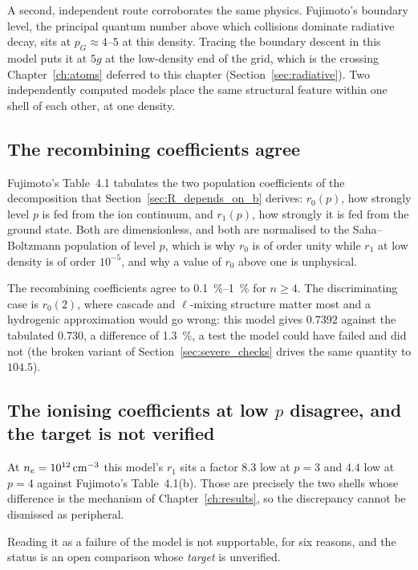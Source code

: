 A second, independent route corroborates the same physics. Fujimoto's boundary
level, the principal quantum number above which collisions dominate radiative
decay, sits at $p_G \approx 4$--$5$ at this density. Tracing the boundary
descent in this model puts it at $5g$ at the low-density end of the grid, which
is the crossing Chapter~\ref{ch:atoms} deferred to this chapter
(Section~\ref{sec:radiative}). Two independently computed models place the same
structural feature within one shell of each other, at one density.

\subsection{The recombining coefficients agree}

Fujimoto's Table~4.1 tabulates the two population coefficients of the
decomposition that Section~\ref{sec:R_depends_on_b} derives: $r_0(p)$, how
strongly level $p$ is fed from the ion continuum, and $r_1(p)$, how strongly it
is fed from the ground state. Both are dimensionless, and both are normalised to
the Saha--Boltzmann population of level $p$, which is why $r_0$ is of order unity
while $r_1$ at low density is of order $10^{-5}$, and why a value of $r_0$ above
one is unphysical.

The recombining coefficients agree to \SIrange{0.1}{1}{\percent} for $n \ge 4$.
The discriminating case is $r_0(2)$, where cascade and $\ell$-mixing structure
matter most and a hydrogenic approximation would go wrong: this model gives
$0.7392$ against the tabulated $0.730$, a difference of \SI{1.3}{\percent}, a
test the model could have failed and did not (the broken variant of
Section~\ref{sec:severe_checks} drives the same quantity to $104.5$).

\subsection{The ionising coefficients at low $p$ disagree, and the target is
not verified}

At $n_e = \SI{e12}{\per\cubic\centi\metre}$ this model's $r_1$ sits a factor
$8.3$ low at $p=3$ and $4.4$ low at $p=4$ against Fujimoto's Table~4.1(b).
Those are precisely the two shells whose difference is the mechanism of
Chapter~\ref{ch:results}, so the discrepancy cannot be dismissed as peripheral.

Reading it as a failure of the model is not supportable, for six reasons, and
the status is an open comparison whose \emph{target} is unverified.

